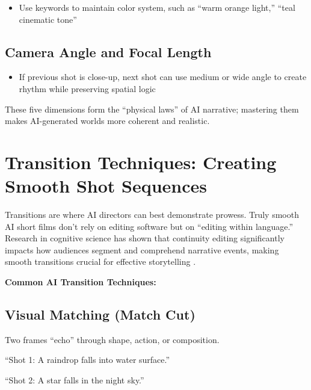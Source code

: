 \begin{itemize}
\item Use keywords to maintain color system, such as ``warm orange light,'' ``teal cinematic tone''
\end{itemize}

\subsection{Camera Angle and Focal Length}

\begin{itemize}
\item If previous shot is close-up, next shot can use medium or wide angle to create rhythm while preserving spatial logic
\end{itemize}

These five dimensions form the ``physical laws'' of AI narrative; mastering them makes AI-generated worlds more coherent and realistic.

\section{Transition Techniques: Creating Smooth Shot Sequences}
\label{sec:transition-magic}

Transitions are where AI directors can best demonstrate prowess. Truly smooth AI short films don't rely on editing software but on ``editing within language.'' Research in cognitive science has shown that continuity editing significantly impacts how audiences segment and comprehend narrative events, making smooth transitions crucial for effective storytelling \citep{magliano2011impact}.

\textbf{Common AI Transition Techniques:}

\subsection{Visual Matching (Match Cut)}

Two frames ``echo'' through shape, action, or composition.

\begin{Prompt}
``Shot 1: A raindrop falls into water surface.''

``Shot 2: A star falls in the night sky.''
\end{Prompt}

